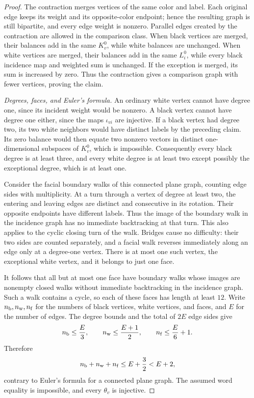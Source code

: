 \begin{proof}
The contraction merges vertices of the same color and label.  Each
original edge keeps its weight and its opposite-color endpoint; hence
the resulting graph is still bipartite, and every edge weight is
nonzero.  Parallel edges created by the contraction are allowed in
the comparison class.  When black vertices are merged, their
balances add in the same $K_v^0$, while white balances are unchanged.
When white vertices are merged, their balances add in the same
$L_i^0$, while every black incidence map and weighted sum is
unchanged.  If the exception is merged, its sum is increased by zero.
Thus the contraction gives a comparison graph with fewer vertices,
proving the claim.



\emph{Degrees, faces, and Euler's formula.}
An ordinary white vertex cannot have degree one, since its incident
weight would be nonzero.  A black vertex cannot have degree one
either, since the maps $\iota_{vi}$ are injective.  If a black vertex
had degree two, its two white neighbors would have distinct labels
by the preceding claim.  Its zero balance would then equate two
nonzero vectors in distinct one-dimensional subspaces of $K_v^0$,
which is impossible.  Consequently every black degree is at least
three, and every white degree is at least two except possibly the
exceptional degree, which is at least one.

Consider the facial boundary walks of this connected plane graph,
counting edge sides with multiplicity.  At a turn through a vertex
of degree at least two, the entering and leaving edges are distinct
and consecutive in its rotation.  Their opposite endpoints have
different labels.  Thus the image of the boundary walk in the
incidence graph has no immediate backtracking at that turn.  This
also applies to the cyclic closing turn of the walk.  Bridges cause
no difficulty: their two sides are counted separately, and a facial
walk reverses immediately along an edge only at a degree-one vertex.
There is at most one such vertex, the exceptional white vertex, and
it belongs to just one face.

It follows that all but at most one face have boundary walks whose
images are nonempty closed walks without immediate backtracking in
the incidence graph.  Such a walk contains a cycle, so each of these
faces has length at least $12$.  Write $n_{\rm b},n_{\rm w},n_{\rm f}$
for the numbers of black vertices, white vertices, and faces, and
$E$ for the number of edges.  The degree bounds and the total of
$2E$ edge sides give
\[
  n_{\rm b}\le\frac E3,\qquad
  n_{\rm w}\le\frac{E+1}{2},\qquad
  n_{\rm f}\le\frac E6+1.
\]
Therefore
\[
  n_{\rm b}+n_{\rm w}+n_{\rm f}
  \le E+\frac32<E+2,
\]
contrary to Euler's formula for a connected plane graph.  The
assumed word equality is impossible, and every $\theta_v$ is
injective.
\end{proof}

